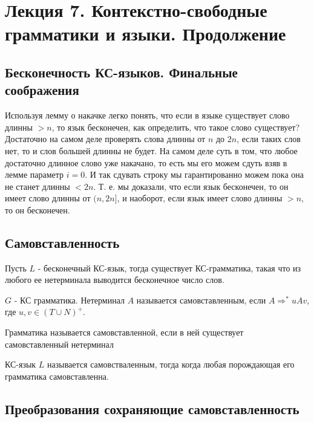 \chapter{Лекция 7. Контекстно-свободные грамматики и языки. Продолжение}

\section{Бесконечность КС-языков. Финальные соображения}

Используя лемму о накачке легко понять, что если в языке существует слово длинны $>n$, то язык бесконечен, как определить, что такое слово существует? Достаточно
на самом деле проверять слова длинны от $n$ до $2n$, если таких слов нет, то и слов большей длинны не будет. На самом деле суть в том, что любое достаточно длинное
слово уже накачано, то есть мы его можем сдуть взяв в лемме параметр $i = 0$. И так сдувать строку мы гарантированно можем пока она не станет длинны $<2n$. Т. е.
мы доказали, что если язык бесконечен, то он имеет слово длинны от $(n, 2n]$, и наоборот, если язык имеет слово длинны $> n$, то он бесконечен.

\section{Самовставленность}

Пусть $L$ - бесконечный КС-язык, тогда существует КС-грамматика, такая что из любого ее нетерминала выводится бесконечное число слов.

\begin{Def}
$G$ - КС грамматика. Нетерминал $A$ называется самовставленным, если $A \Rightarrow^{*} uAv$, где $u,v \in \left(T \cup N\right)^{+}$.
\end{Def}

\begin{Def}
Грамматика называется самовставленной, если в ней существует самовставленный нетерминал
\end{Def}

\begin{Def}
КС-язык $L$ называется самовстваленным, тогда когда любая порождающая его грамматика самовставленна.
\end{Def}

\section{Преобразования сохраняющие самовставленность}

